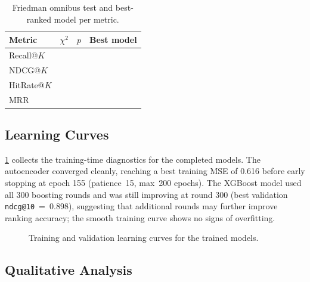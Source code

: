 \begin{table}[t]
\centering
\caption{Friedman omnibus test and best-ranked model per metric.}
\label{tab:friedman}
\footnotesize
\begin{tabular}{l c c l}
\toprule
\textbf{Metric} & \textbf{$\chi^2$} & \textbf{$p$} & \textbf{Best model} \\
\midrule
Recall@$K$  & \TODO{} & \TODO{} & \TODO{} \\
NDCG@$K$    & \TODO{} & \TODO{} & \TODO{} \\
HitRate@$K$ & \TODO{} & \TODO{} & \TODO{} \\
MRR         & \TODO{} & \TODO{} & \TODO{} \\
\bottomrule
\end{tabular}
\end{table}

\subsection{Learning Curves}

\cref{fig:curves} collects the training-time diagnostics for the completed
models. The autoencoder converged cleanly, reaching a best training MSE of
0.616 before early stopping at epoch 155 (patience~15, max~200 epochs).
The XGBoost model used all 300 boosting rounds and was still improving at
round 300 (best validation \texttt{ndcg@10}~=~0.898), suggesting that
additional rounds may further improve ranking accuracy; the smooth training
curve shows no signs of overfitting. 

\begin{figure}[t]
\centering
{}
\caption{Training and validation learning curves for the trained models.}
\label{fig:curves}
\end{figure}

\subsection{Qualitative Analysis}

